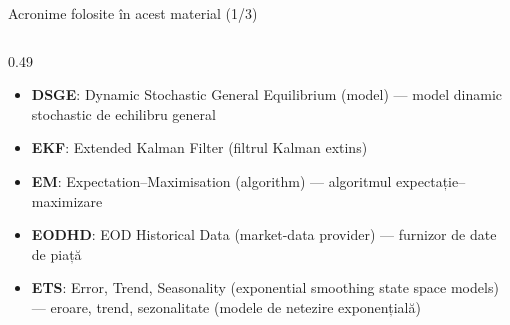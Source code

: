 \begin{frame}{Acronime folosite în acest material (1/3)}
\begin{columns}[T]
\begin{column}{0.49\textwidth}
\begin{itemize}
    \item \textbf{DSGE}: Dynamic Stochastic General Equilibrium (model) — model dinamic stochastic de echilibru general
    \item \textbf{EKF}: Extended Kalman Filter (filtrul Kalman extins)
    \item \textbf{EM}: Expectation–Maximisation (algorithm) — algoritmul expectație–maximizare
    \item \textbf{EODHD}: EOD Historical Data (market-data provider) — furnizor de date de piață
    \item \textbf{ETS}: Error, Trend, Seasonality (exponential smoothing state space models) — eroare, trend, sezonalitate (modele de netezire exponențială)
\end{itemize}
\end{column}
\end{columns}
\end{frame}
